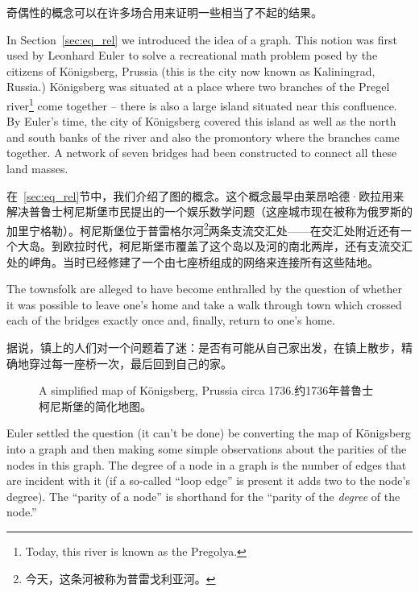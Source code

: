 奇偶性的概念可以在许多场合用来证明一些相当了不起的结果。

In Section~\ref{sec:eq_rel} we introduced the idea of a graph.  This
notion was first used by  Leonhard Euler to solve
a recreational math problem posed by the citizens of 
K\"{o}nigsberg, Prussia (this is the city now known
as  Kaliningrad, Russia.)  K\"{o}nigsberg was situated 
at a place where two branches of the  Pregel river\footnote{Today, this river is known as the Pregolya.} come together -- there is also
a large island situated near this confluence.  By Euler's time, the city of
 K\"{o}nigsberg covered this island as well as the north and south banks of the
river and also the promontory where the branches came together.  A network of
seven bridges had been constructed to connect all these land masses.

在~\ref{sec:eq_rel}节中，我们介绍了图的概念。这个概念最早由莱昂哈德·欧拉用来解决普鲁士柯尼斯堡市民提出的一个娱乐数学问题（这座城市现在被称为俄罗斯的加里宁格勒）。柯尼斯堡位于普雷格尔河\footnote{今天，这条河被称为普雷戈利亚河。}两条支流交汇处——在交汇处附近还有一个大岛。到欧拉时代，柯尼斯堡市覆盖了这个岛以及河的南北两岸，还有支流交汇处的岬角。当时已经修建了一个由七座桥组成的网络来连接所有这些陆地。

The
townsfolk are alleged to have become enthralled by the question of whether it
was possible to leave one's home and take a walk through town
which crossed each of the bridges exactly once and, finally, return to one's
home.

据说，镇上的人们对一个问题着了迷：是否有可能从自己家出发，在镇上散步，精确地穿过每一座桥一次，最后回到自己的家。

\begin{figure}[!hbtp]
\begin{center}

\end{center}
\caption[K\"{o}nigsberg, Prussia.普鲁士，柯尼斯堡。]{A simplified map of K\"{o}nigsberg, Prussia
circa 1736.约1736年普鲁士柯尼斯堡的简化地图。}
\label{fig:kon_map} 
\end{figure}

Euler settled the question (it can't be done) be converting the map of 
K\"{o}nigsberg into a graph and then making some simple observations about
the parities of the nodes in this graph.  The  degree of a node
in a graph is the number of edges that are incident with it (if a so-called
``loop edge'' is present it adds two to the node's degree).  The ``parity
of a node'' is shorthand for the ``parity of the \emph{degree} of the node.'' 
 

